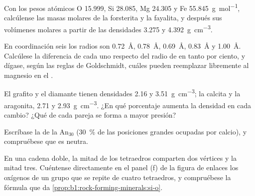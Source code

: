 \begin{exercise}[$\star$]\label{exo:b1:rock-forming-minerals:2}
Con los pesos atómicos O \num{15.999}, Si \num{28.085}, Mg \num{24.305} y Fe \qty{55.845}{g.mol^{-1}}, calcúlense
las masas molares de la forsterita y la fayalita, y después sus volúmenes molares a partir de las densidades
\num{3.275} y \qty{4.392}{g.cm^{-3}}.
\end{exercise}

\begin{exercise}[$\star$]\label{exo:b1:rock-forming-minerals:3}
En coordinación seis los radios son  \qty{0.72}{\angstrom},  \qty{0.78}{\angstrom},
 \qty{0.69}{\angstrom},  \qty{0.83}{\angstrom} y  \qty{1.00}{\angstrom}.
Calcúlese la diferencia de cada uno respecto del radio de  en tanto por ciento, y dígase, según las
reglas de Goldschmidt, cuáles pueden reemplazar libremente al magnesio en el .
\end{exercise}

\begin{exercise}[$\star$]\label{exo:b1:rock-forming-minerals:4}
El grafito y el diamante tienen densidades \num{2.16} y \qty{3.51}{g.cm^{-3}}; la calcita y la aragonita,
\num{2.71} y \qty{2.93}{g.cm^{-3}}. ¿En qué porcentaje aumenta la densidad en cada cambio? ¿Qué  de cada
pareja se forma a mayor presión?
\end{exercise}

\begin{exercise}[$\star\star$]\label{exo:b1:rock-forming-minerals:5}
Escríbase la  de la  $\text{An}_{30}$ (\qty{30}{\percent} de las posiciones grandes
ocupadas por calcio), y compruébese que es neutra.
\end{exercise}

\begin{exercise}[$\star\star$]\label{exo:b1:rock-forming-minerals:6}
En una cadena doble, la mitad de los tetraedros comparten dos vértices y la mitad tres. Cuéntense directamente en
el panel (f) de la figura de enlaces los oxígenos de un grupo que se repite de cuatro tetraedros, y compruébese la
fórmula  que da \cref{prop:b1:rock-forming-minerals:si-o}.
\end{exercise}


